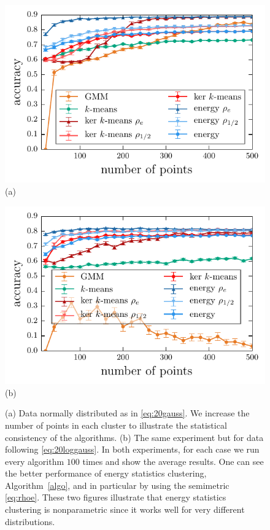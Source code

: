 \documentclass[aps,preprint,nofootinbib,floatfix]{revtex4-1}
\begin{document}
\begin{figure}
\begin{minipage}{0.49\textwidth}
\centering
\includegraphics[width=1\textwidth]{gauss.pdf}\\[-1.0em]
(a)
\end{minipage}
\begin{minipage}{0.49\textwidth}
\centering
\includegraphics[width=1\textwidth]{loggauss.pdf}\\[-1.0em]
(b)
\end{minipage}
\caption{
\label{fig:consist}
(a) Data normally distributed as in 
\eqref{eq:20gauss}. We increase the number of points in each cluster to
illustrate the statistical consistency of the algorithms.
(b) The same experiment but for data following \eqref{eq:20loggauss}.
In both experiments, for each case we run every algorithm $100$ times and show
the average results. One can see the better performance of energy statistics
clustering, Algorithm~\ref{algo}, and in particular by using the semimetric
\eqref{eq:rhoe}. These two figures illustrate that energy statistics clustering
is nonparametric since it works well for very different distributions.
}
\end{figure}
\end{document}
